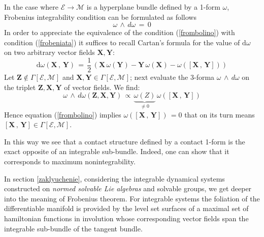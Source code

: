 \documentclass[10pt,a4paper]{article}
\begin{document}
In the case where $\mathcal{E} \longrightarrow \mathcal{M}$  is a
hyperplane bundle defined by a  1-form $\omega$,  Frobenius integrability condition
can be formulated as follows
\begin{equation}\label{frombolino}
    \omega \, \wedge \, d\omega \, = \, 0
\end{equation}
In order to appreciate the equivalence of the  condition (\ref{frombolino}) with
condition (\ref{frobeniata}) it suffices to recall Cartan's
formula for the value of $\mathrm{d}\omega$ on two arbitrary vector fields
 $\mathbf{X},\mathbf{Y}$:
\begin{equation}\label{cornicione}
    \mathrm{d}\omega\left(\mathbf{X}\, ,\,\mathbf{Y}\right) \, = \, \frac{1}{2} \, \left(\mathbf{X} \, \omega\left(\mathbf{Y}\right) -
    \mathbf{Y }\, \omega \left(\mathbf{X}\right)
    - \omega\left( \left[\mathbf{X} \, , \, \mathbf{Y}\right]\right)\right)
\end{equation}
Let $\mathbf{Z} \notin \Gamma[\mathcal{E},\mathcal{M}]$ and
$\mathbf{X},\mathbf{Y} \in \Gamma[\mathcal{E},\mathcal{M}]$;  next evaluate
the  3-forma $\omega \, \wedge \, d\omega $ on the  triplet
 $\mathbf{Z},\mathbf{X},\mathbf{Y}$ of vector fields. We find:
\begin{equation}\label{grugliasco}
    \omega \, \wedge \, d\omega\left(\mathbf{Z},\mathbf{X},\mathbf{Y}\right) \, \propto \,
    \underbrace{\omega\left(Z\right)}_{\neq 0} \, \omega\left(\left[\mathbf{X}\, ,
    \,\mathbf{Y}\right]\right)
\end{equation}
Hence equation (\ref{frombolino}) implies
$\omega\left(\left[\mathbf{X}\, ,
    \,\mathbf{Y}\right]\right)\, = 0$ that on its turn means $\left[\mathbf{X}\, ,
    \,\mathbf{Y}\right] \in \Gamma[\mathcal{E},\mathcal{M}]$.
\par
In this way we see that a contact structure defined by a contact 1-form is the exact opposite of an integrable sub-bundle. Indeed, one can show that it corresponds to maximum nonintegrability.
\par In section \ref{zaklyuchenie}, considering the integrable dynamical systems constructed on \textit{normed solvable Lie algebras} and solvable groups,
we get deeper into the meaning of Frobenius theorem. For integrable systems the foliation of the differentiable manifold is provided by the level set surfaces of a maximal set of hamiltonian functions in involution whose corresponding vector fields span the integrable sub-bundle of the tangent bundle.
\end{document}

